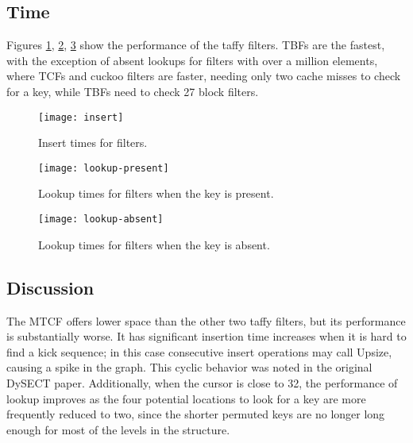 \documentclass[manuscript,screen,review]{acmart}
\begin{document}
\subsection{Time}

Figures \ref{insert-time}, \ref{lookup-present}, \ref{lookup-absent} show the performance of the taffy filters.
TBFs are the fastest, with the exception of absent lookups for filters with over a million elements, where TCFs and cuckoo filters are faster, needing only two cache misses to check for a key, while TBFs need to check 27 block filters.


\begin{figure}
  \texttt{[image: insert]}
  \caption{
    \label{insert-time}
    Insert times for filters.
  }
\end{figure}

\begin{figure}
  \texttt{[image: lookup-present]}
  \caption{
    \label{lookup-present}
    Lookup times for filters when the key is present.
  }
\end{figure}

\begin{figure}
  \texttt{[image: lookup-absent]}
  \caption{
    \label{lookup-absent}
    Lookup times for filters when the key is absent.
  }
\end{figure}

\subsection{Discussion}

The MTCF offers lower space than the other two taffy filters, but its performance is substantially worse.
It has significant insertion time increases when it is hard to find a kick sequence; in this case consecutive insert operations may call Upsize, causing a spike in the graph.
This cyclic behavior was noted in the original DySECT paper. \cite{dysect}
Additionally, when the cursor is close to 32, the performance of lookup improves as the four potential locations to look for a key are more frequently reduced to two, since the shorter permuted keys are no longer long enough for most of the levels in the structure.
\end{document}
